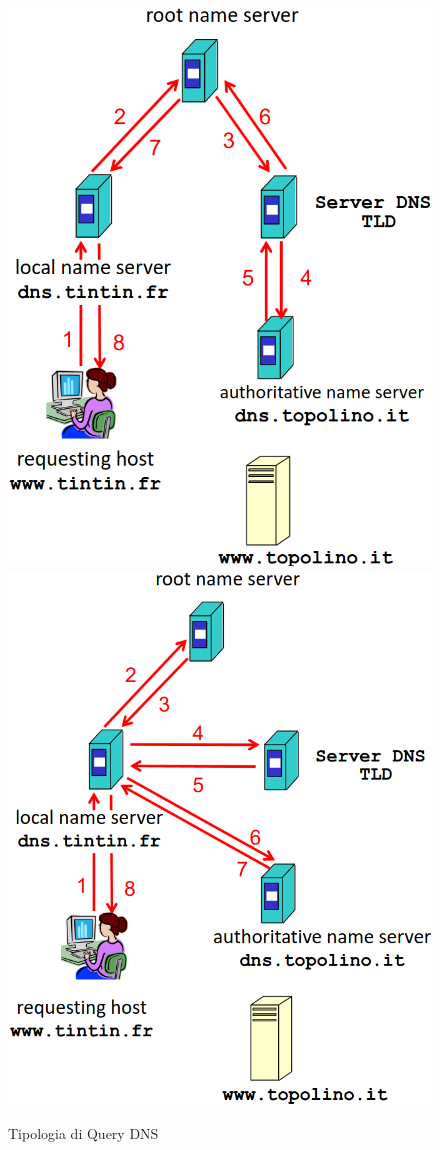 \begin{figure}[h]
    \centering
    \includegraphics[scale=0.25]{Immagini/Query_Ricorsiva.png}
    \includegraphics[scale=0.25]{Immagini/Query_Iterativa.png}
    \caption{Tipologia di Query DNS}
\end{figure}
\newpage
